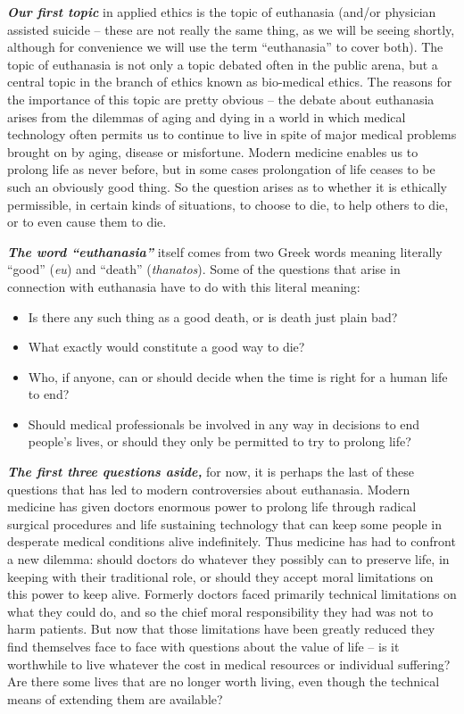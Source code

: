 \documentclass[
  12pt, openany]{book}
\makeatletter
\providecommand{\tightlist}{%
  \setlength{\itemsep}{0pt}\setlength{\parskip}{0pt}}
\newenvironment{kframe}{%
\medskip{}
\setlength{\fboxsep}{.8em}
 \def\at@end@of@kframe{}%
 \ifinner\ifhmode%
  \def\at@end@of@kframe{\end{minipage}}%
  \begin{minipage}{\columnwidth}%
 \fi\fi%
 \def\FrameCommand##1{\hskip\@totalleftmargin \hskip-\fboxsep
 \colorbox{shadecolor}{##1}\hskip-\fboxsep
     \hskip-\linewidth \hskip-\@totalleftmargin \hskip\columnwidth}%
 \MakeFramed {\advance\hsize-\width
   \@totalleftmargin\z@ \linewidth\hsize
   \@setminipage}}%
 {\par\unskip\endMakeFramed%
 \at@end@of@kframe}
\newenvironment{rmdblock}[1]
  {
  \begin{itemize}
  \renewcommand{\labelitemi}{
    \raisebox{-.7\height}[0pt][0pt]{
      {\setkeys{Gin}{width=3em,keepaspectratio}\texttt{[image: img/\#1]}}
    }
  }
  \setlength{\fboxsep}{1em}
  \begin{kframe}
  \item
  }
  {
  \end{kframe}
  \end{itemize}
  }
\newenvironment{question}
  {\begin{rmdblock}{question}}
  {\end{rmdblock}}
\theoremstyle{definition}
\theoremstyle{definition}
\theoremstyle{definition}
\theoremstyle{definition}
\theoremstyle{remark}
\makeatother
\begin{document}
\textbf{\emph{Our first topic}} in applied ethics is the topic of euthanasia (and/or physician assisted suicide -- these are not really the same thing, as we will be seeing shortly, although for convenience we will use the term ``euthanasia'' to cover both). The topic of euthanasia is not only a topic debated often in the public arena, but a central topic in the branch of ethics known as bio-medical ethics. The reasons for the importance of this topic are pretty obvious -- the debate about euthanasia arises from the dilemmas of aging and dying in a world in which medical technology often permits us to continue to live in spite of major medical problems brought on by aging, disease or misfortune. Modern medicine enables us to prolong life as never before, but in some cases prolongation of life ceases to be such an obviously good thing. So the question arises as to whether it is ethically permissible, in certain kinds of situations, to choose to die, to help others to die, or to even cause them to die.

\textbf{\emph{The word ``euthanasia''}} itself comes from two Greek words meaning literally ``good'' (\emph{eu}) and ``death'' (\emph{thanatos}). Some of the questions that arise in connection with euthanasia have to do with this literal meaning:

\begin{question}

\begin{itemize}
\tightlist
\item
  Is there any such thing as a good death, or is death just plain bad?
\item
  What exactly would constitute a good way to die?
\item
  Who, if anyone, can or should decide when the time is right for a human life to end?
\item
  Should medical professionals be involved in any way in decisions to end people's lives, or should they only be permitted to try to prolong life?
\end{itemize}


\end{question}

\textbf{\emph{The first three questions aside,}} for now, it is perhaps the last of these questions that has led to modern controversies about euthanasia. Modern medicine has given doctors enormous power to prolong life through radical surgical procedures and life sustaining technology that can keep some people in desperate medical conditions alive indefinitely. Thus medicine has had to confront a new dilemma: should doctors do whatever they possibly can to preserve life, in keeping with their traditional role, or should they accept moral limitations on this power to keep alive. Formerly doctors faced primarily technical limitations on what they could do, and so the chief moral responsibility they had was not to harm patients. But now that those limitations have been greatly reduced they find themselves face to face with questions about the value of life -- is it worthwhile to live whatever the cost in medical resources or individual suffering? Are there some lives that are no longer worth living, even though the technical means of extending them are available?
\end{document}
